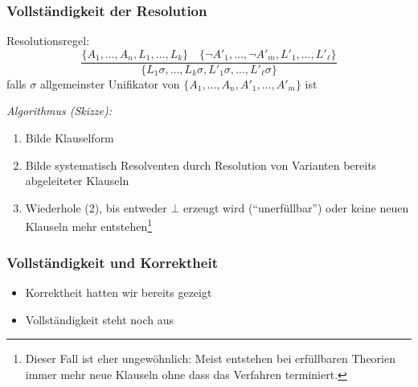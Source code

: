 \documentclass[aspectratio=1610,onlymath]{beamer}
\begin{document}
\maketitle

\bgroup
{}
\egroup


\begin{frame}\frametitle{Vollständigkeit der Resolution}

Resolutionsregel:
\[  \frac{
\{A_1,\ldots,A_n,L_1,\ldots,L_k\}\quad
\{\neg A'_1,\ldots,\neg A'_m,L'_1,\ldots,L'_\ell\}
}{\{L_1\sigma,\ldots,L_k\sigma,L'_1\sigma,\ldots,L'_\ell\sigma\}
}\]
falls $\sigma$ allgemeinster Unifikator von $\{A_1,\ldots,A_n, A'_1,\ldots, A'_m\}$ ist\bigskip

\emph{Algorithmus (Skizze):}
\begin{enumerate}[(1)]
\item Bilde Klauselform
\item Bilde systematisch Resolventen durch Resolution von Varianten bereits abgeleiteter Klauseln
\item Wiederhole (2), bis entweder $\bot$ erzeugt wird ("`unerfüllbar"') oder keine neuen Klauseln mehr entstehen\footnote{Dieser Fall ist eher ungewöhnlich: Meist entstehen bei erfüllbaren Theorien immer mehr neue Klauseln ohne dass das Verfahren terminiert.}
\end{enumerate}

\end{frame}

\begin{frame}\frametitle{Vollständigkeit und Korrektheit}


\begin{itemize}
\item Korrektheit hatten wir bereits gezeigt
\item Vollständigkeit steht noch aus
\end{itemize}

\end{frame}
\end{document}
